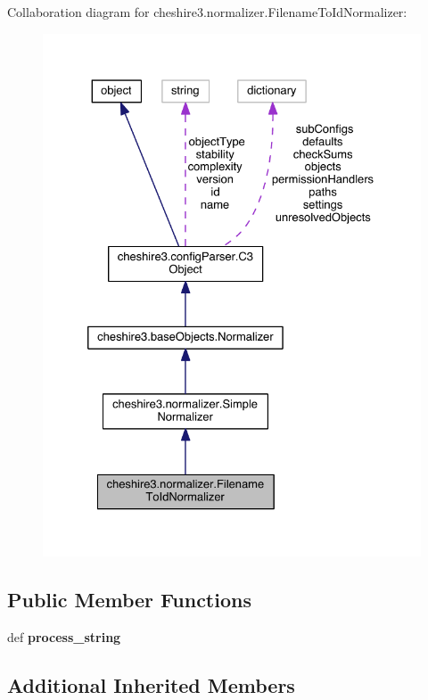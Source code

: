 Collaboration diagram for cheshire3.\-normalizer.\-Filename\-To\-Id\-Normalizer\-:
\nopagebreak
\begin{figure}[H]
\begin{center}
\leavevmode
\includegraphics[width=328pt]{classcheshire3_1_1normalizer_1_1_filename_to_id_normalizer__coll__graph}
\end{center}
\end{figure}
\subsection*{Public Member Functions}
\begin{DoxyCompactItemize}
\item 
\hypertarget{classcheshire3_1_1normalizer_1_1_filename_to_id_normalizer_ac9b6c4213798b1174555cd2af9e7f19d}{def {\bfseries process\-\_\-string}}\label{classcheshire3_1_1normalizer_1_1_filename_to_id_normalizer_ac9b6c4213798b1174555cd2af9e7f19d}

\end{DoxyCompactItemize}
\subsection*{Additional Inherited Members}


